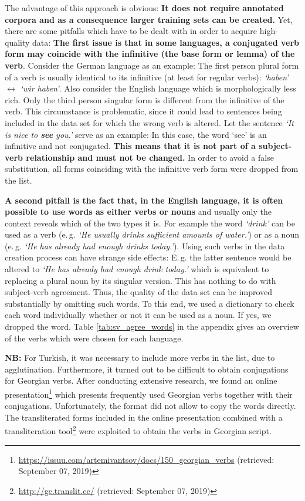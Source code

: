 The advantage of this approach is obvious: \textbf{It does not require annotated corpora and as a consequence larger training sets can be created.} Yet, there are some pitfalls which have to be dealt with in order to acquire high-quality data:  \textbf{The first issue is that in some languages, a conjugated verb form may coincide with the infinitive (the base form or lemma) of the verb}. Consider the German language as an example: The first person plural form of a verb is usually identical to its infinitive (at least for regular verbs): \textit{`haben' $\leftrightarrow$ `wir haben'}. Also consider the English language which is morphologically less rich. Only the third person singular form is different from the infinitive of the verb. This circumstance is problematic, since it could lead to sentences being included in the data set for which the wrong verb is altered. Let the sentence \textit{`It is nice to \textbf{see} you.'} serve as an example: In this case, the word `see' is an infinitive and not conjugated. \textbf{This means that it is not part of a subject-verb relationship and must not be changed.} In order to avoid a false substitution, all forms coinciding with the infinitive verb form were dropped from the list.

 \textbf{A second pitfall is the fact that, in the English language, it is often possible to use words as either verbs or nouns} and usually only the context reveals which of the two types it is. For example the word \textit{`drink'} can be used as a verb (e.\,g. \textit{`He usually drinks sufficient amounts of water.'}) or as a noun (e.\,g. \textit{`He has already had enough drinks today.'}). Using such verbs in the data creation process can have strange side effects: E.\,g. the latter sentence would be altered to \textit{`He has already had enough drink today.'} which is equivalent to replacing a plural noun by its singular version. This has nothing to do with subject-verb agreement. Thus, the quality of the data set can be improved substantially by omitting such words. To this end, we used a dictionary to check each word individually whether or not it can be used as a noun. If yes, we dropped the word. Table \vref{tab:sv_agree_words} in the appendix gives an overview of the verbs which were chosen for each language.

\textbf{NB:} For Turkish, it was necessary to include more verbs in the list, due to agglutination. Furthermore, it turned out to be difficult to obtain conjugations for Georgian verbs. After conducting extensive research, we found an online presentation\footnote{\url{https://issuu.com/artemivantsov/docs/150_georgian_verbs} (retrieved: September 07, 2019)} which presents frequently used Georgian verbs together with their conjugations. Unfortunately, the format did not allow to copy the words directly. The transliterated forms included in the online presentation combined with a transliteration tool\footnote{\url{http://ge.translit.cc/} (retrieved: September 07, 2019)} were exploited to obtain the verbs in Georgian script.

